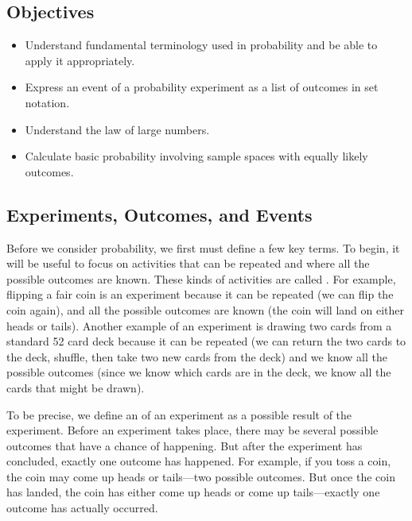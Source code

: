 \documentclass[letterpaper,10pt,english]{jupyterBook}
\begin{document}
\subsection{Objectives}
\label{\detokenize{Ch3 Probability/3.1 Introduction to Probability:objectives}}\begin{itemize}
\item {} 
\sphinxAtStartPar
Understand fundamental terminology used in probability and be able to apply it appropriately.

\item {} 
\sphinxAtStartPar
Express an event of a probability experiment as a list of outcomes in set notation.

\item {} 
\sphinxAtStartPar
Understand the law of large numbers.

\item {} 
\sphinxAtStartPar
Calculate basic probability involving sample spaces with equally likely outcomes.

\end{itemize}


\subsection{Experiments, Outcomes, and Events}
\label{\detokenize{Ch3 Probability/3.1 Introduction to Probability:experiments-outcomes-and-events}}
\sphinxAtStartPar
Before we consider probability, we first must define a few key terms. To begin, it will be useful to focus on activities that can be repeated and where all the possible outcomes are known. These kinds of activities are called . For example, flipping a fair coin is an experiment because it can be repeated (we can flip the coin again), and all the possible outcomes are known (the coin will land on either heads or tails). Another example of an experiment is drawing two cards from a standard 52 card deck because it can be repeated (we can return the two cards to the deck, shuffle, then take two new cards from the deck) and we know all the possible outcomes (since we know which cards are in the deck, we know all the cards that might be drawn).

\sphinxAtStartPar
To be precise, we define an  of an experiment as a possible result of the experiment. Before an experiment takes place, there may be several possible outcomes that have a chance of happening. But after the experiment has concluded, exactly one outcome has happened. For example, if you toss a coin, the coin may come up heads or tails—two possible outcomes. But once the coin has landed, the coin has either come up heads or come up tails—exactly one outcome has actually occurred.
\end{document}
